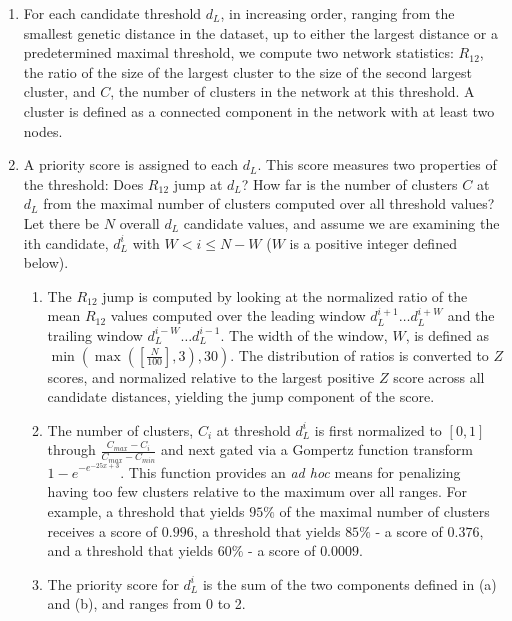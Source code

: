 \documentclass[utf8]{FrontiersinHarvard} %
\begin{document}
\begin{enumerate}
	\item{For each candidate threshold $d_L$, in increasing order, ranging from the smallest genetic distance in the dataset, up to either the largest distance or a predetermined maximal threshold, we compute two network statistics: $R_{12}$, the ratio of the size of the largest cluster to the size of the second largest cluster, and $C$, the number of clusters in the network at this threshold. A cluster is defined as a connected component in the network with at least two nodes.}

	\item{ A priority score is assigned to each $d_L$. This score measures two properties of the threshold: Does $R_{12}$ jump at $d_L$? How far is the number of clusters $C$ at $d_L$ from the maximal number of clusters computed over all threshold values? Let there be $N$ overall $d_L$ candidate values, and assume we are examining the ith candidate, $d_L^i$ with $W < i \leq N - W$ ($W$ is a positive integer defined below).

	            \begin{enumerate}
		            \item{The $R_{12}$ jump is computed by looking at the normalized ratio of the mean $R_{12}$ values computed over the leading window $d_L^{i+1}…d_L^{i+W}$ and the trailing window $d_L^{i-W}… d_L^{i-1}$. The width of the window, $W$, is defined as $\min \left( \max \left(\left[\frac{N}{100}\right], 3\right), 30 \right)$. The distribution of ratios is converted to $Z$ scores, and normalized relative to the largest positive $Z$ score across all candidate distances, yielding the jump component of the score.}
		            \item{The number of clusters, $C_i$ at threshold $d_L^i$ is first normalized to $[0,1]$ through $\frac{{C_{max} - C_i}}{{C_{max} -C_{min}}}$ and next gated via a Gompertz function transform ${1-e}^{-e^{-25x+3}}$. This function provides an \emph{ad hoc} means for penalizing having too few clusters relative to the maximum over all ranges. For example, a threshold that yields $95\%$ of the maximal number of clusters receives a score of $0.996$,  a threshold that yields $85\%$ - a score of $0.376$, and a threshold that yields $60\%$ - a score of $0.0009$.}
		            \item{The priority score for $d_L^i$ is the sum of the two components defined in (a) and (b), and ranges from 0 to 2.}
	            \end{enumerate}}


\end{enumerate}
\end{document}
